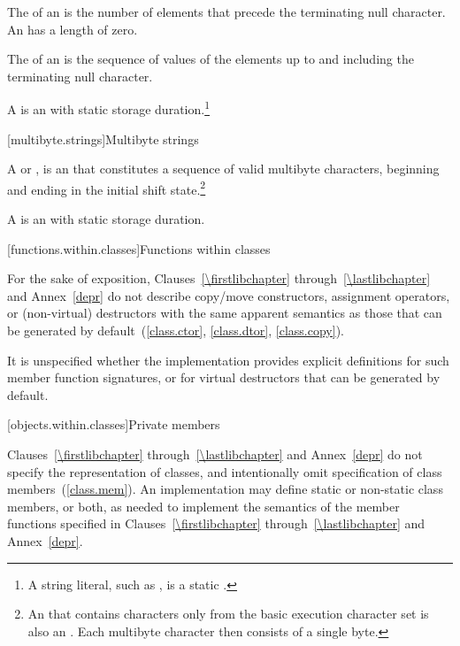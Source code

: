 \pnum
The
 of an \ntbs
is the number of elements that
precede the terminating null character.
%
An
 \ntbs
has a length of zero.

\pnum
The
 of an \ntbs
is the sequence of values of the
elements up to and including the terminating null character.
%

\pnum
A
%
%
 \ntbs
is an \ntbs with
static storage duration.\footnote{A string literal, such as
,
is a static \ntbs.}

[multibyte.strings]{Multibyte strings}

\pnum
A
%
%
or \ntmbs,
%
is an \ntbs that constitutes a
sequence of valid multibyte characters, beginning and ending in the initial
shift state.\footnote{An \ntbs that contains characters only from the
basic execution character set is also an \ntmbs.
Each multibyte character then
consists of a single byte.}

\pnum
A
 \ntmbs
is an \ntmbs with static storage duration.
%
%

[functions.within.classes]{Functions within classes}

\pnum
For the sake of exposition, Clauses~\ref{\firstlibchapter} through~\ref{\lastlibchapter}
and Annex~\ref{depr} do not describe copy/move constructors, assignment
operators, or (non-virtual) destructors with the same apparent
semantics as those that can be generated by default~(\ref{class.ctor}, \ref{class.dtor}, \ref{class.copy}).

\pnum
{}%
%
%
It is unspecified whether
the implementation provides explicit definitions for such member function
signatures, or for virtual destructors that can be generated by default.

[objects.within.classes]{Private members}

\pnum
Clauses~\ref{\firstlibchapter} through~\ref{\lastlibchapter} and
Annex~\ref{depr} do not specify the representation of classes, and intentionally
omit specification of class members~(\ref{class.mem}). An implementation may
define static or non-static class members, or both, as needed to implement the
semantics of the member functions specified in Clauses~\ref{\firstlibchapter}
through~\ref{\lastlibchapter} and Annex~\ref{depr}.

